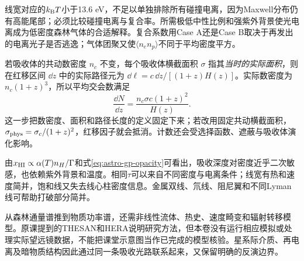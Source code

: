 线宽对应的$k_{\mathrm B} T$小于13.6 eV，不足以单独排除所有碰撞电离，因为Maxwell分布仍有高能尾部；必须比较碰撞电离与复合率。所需极低中性比例和强紫外背景使光电离成为低密度森林气体的合适解释。复合系数用Case A还是Case B取决于再发出的电离光子是否逃逸；气体团聚又使$\langle n_e n_p\rangle$不同于平均密度平方。

若吸收体的共动数密度 $n_c$ 不变，每个吸收体横截面积 $\sigma$ 指其\emph{当时的实际面积}，则在红移区间 $\dd z$ 中的实际路径元为 $\dd\ell=c\,\dd z/[(1+z)H(z)]$。实际数密度为 $n_c(1+z)^3$，所以平均交会数满足
\begin{equation}\label{eq:absorber}
\frac{\dd N}{\dd z}=\frac{n_c\sigma c(1+z)^2}{H(z)}.
\end{equation}
这一步把数密度、面积和路径长度的定义固定下来；若改用固定共动横截面积，$\sigma_{\rm phys}=\sigma_c/(1+z)^2$，红移因子就会抵消。计数还会受选择函数、遮蔽与吸收体演化影响。

由$x_{\rm HI}\propto\alpha(T)n_H/\Gamma$和式\eqref{eq:astro-gp-opacity}可看出，吸收深度对密度近乎二次敏感，也依赖紫外背景和温度。相同$\tau$可以来自不同密度与电离条件；线宽有热和速度简并，饱和线又失去线心柱密度信息。金属双线、氘线、阻尼翼和不同Lyman线可帮助打破部分简并。

从森林通量谱推到物质功率谱，还需非线性流体、热史、速度畸变和辐射转移模型。原课提到的THESAN和HERA说明研究方法，但本卷没有运行相应模拟或处理实际望远镜数据，不能把课堂示意图当作已完成的模型核验。星系际介质、再电离及暗物质结构因此通过同一条吸收光路联系起来，又保留明确的反演边界。
